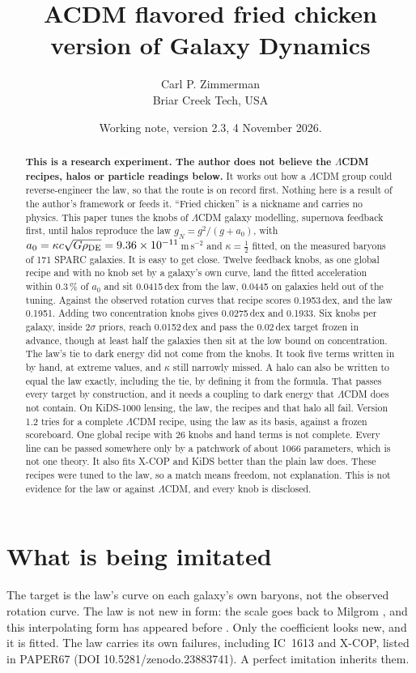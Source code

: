 \documentclass[11pt]{article}
\title{ACDM flavored fried chicken version of Galaxy Dynamics}
\author{Carl P. Zimmerman\\Briar Creek Tech, USA}
\date{Working note, version 2.3, 4 November 2026.}
\begin{document}
\maketitle
\begin{abstract}
\textbf{This is a research experiment. The author does not believe the $\Lambda$CDM recipes, halos or particle readings below.} It works out how a $\Lambda$CDM group could reverse-engineer the law, so that the route is on record first. Nothing here is a result of the author's framework or feeds it. ``Fried chicken'' is a nickname and carries no physics. This paper tunes the knobs of $\Lambda$CDM galaxy modelling, supernova feedback first, until halos reproduce the law $g_N=g^2/(g+a_0)$, with $a_0=\kappa c\sqrt{G\rho_{\rm DE}}=9.36\times10^{-11}$\,m\,s$^{-2}$ and $\kappa=\tfrac12$ fitted, on the measured baryons of 171 SPARC galaxies. It is easy to get close. Twelve feedback knobs, as one global recipe and with no knob set by a galaxy's own curve, land the fitted acceleration within 0.3\,\% of $a_0$ and sit 0.0415\,dex from the law, 0.0445 on galaxies held out of the tuning. Against the observed rotation curves that recipe scores 0.1953\,dex, and the law 0.1951. Adding two concentration knobs gives 0.0275\,dex and 0.1933. Six knobs per galaxy, inside 2$\sigma$ priors, reach 0.0152\,dex and pass the 0.02\,dex target frozen in advance, though at least half the galaxies then sit at the low bound on concentration. The law's tie to dark energy did not come from the knobs. It took five terms written in by hand, at extreme values, and $\kappa$ still narrowly missed. A halo can also be written to equal the law exactly, including the tie, by defining it from the formula. That passes every target by construction, and it needs a coupling to dark energy that $\Lambda$CDM does not contain. On KiDS-1000 lensing, the law, the recipes and that halo all fail. Version 1.2 tries for a complete $\Lambda$CDM recipe, using the law as its basis, against a frozen scoreboard. One global recipe with 26 knobs and hand terms is not complete. Every line can be passed somewhere only by a patchwork of about 1066 parameters, which is not one theory. It also fits X-COP and KiDS better than the plain law does. These recipes were tuned to the law, so a match means freedom, not explanation. This is not evidence for the law or against $\Lambda$CDM, and every knob is disclosed.
\end{abstract}

\section{What is being imitated}
The target is the law's curve on each galaxy's own baryons, not the observed rotation curve. The law is not new in form: the scale goes back to Milgrom \cite{milgrom83,milgrom99}, and this interpolating form has appeared before \cite{limbach08}. Only the coefficient looks new, and it is fitted. The law carries its own failures, including IC~1613 and X-COP, listed in PAPER67 (DOI 10.5281/zenodo.23883741). A perfect imitation inherits them.
\end{document}
